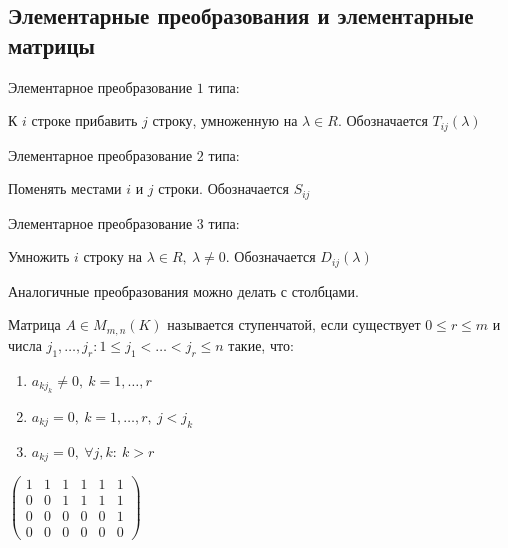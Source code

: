 \subsection{Элементарные преобразования и элементарные матрицы}

\begin{defn}
    Элементарное преобразование $1$ типа:

    К $i$ строке прибавить $j$ строку, умноженную на $\lambda \in R$. Обозначается $T_{ij}(\lambda)$
\end{defn}

\begin{defn}
    Элементарное преобразование $2$ типа:

    Поменять местами $i$ и $j$ строки. Обозначается $S_{ij}$
\end{defn}

\begin{defn}
    Элементарное преобразование $3$ типа:

    Умножить $i$ строку на $\lambda \in R,~\lambda \neq 0$. Обозначается $D_{ij}(\lambda)$
\end{defn}

\begin{notice}
    Аналогичные преобразования можно делать с столбцами.
\end{notice}

\begin{defn}
    Матрица $A \in M_{m, n}(K)$ называется ступенчатой, если существует $0 \leq r \leq m$ и числа $j_1, \ldots, j_r: 1 \leq j_1 < \ldots < j_r \leq n$ такие, что:
    
    \begin{enumerate}
        \item $a_{kj_k} \neq 0,~k = 1, \ldots, r$
        
        \item $a_{kj} = 0,~k = 1, \ldots, r,~j < j_k$
        
        \item $a_{kj} = 0,~\forall j, k:~ k > r$
    \end{enumerate}
\end{defn} 

\begin{example}
    $\begin{pmatrix}
        1 & 1 & 1 & 1 & 1 & 1 \\
        0 & 0 & 1 & 1 & 1 & 1 \\
        0 & 0 & 0 & 0 & 0 & 1 \\
        0 & 0 & 0 & 0 & 0 & 0
    \end{pmatrix}$
\end{example}


